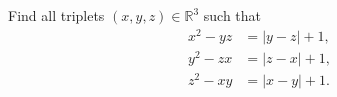Find all triplets $(x,y,z)\in\mathbb{R}^3$ such that
\begin{align*}
x^2-yz &= |y-z|+1, \\ 
y^2-zx &= |z-x|+1, \\ 
z^2-xy &= |x-y|+1.
\end{align*}